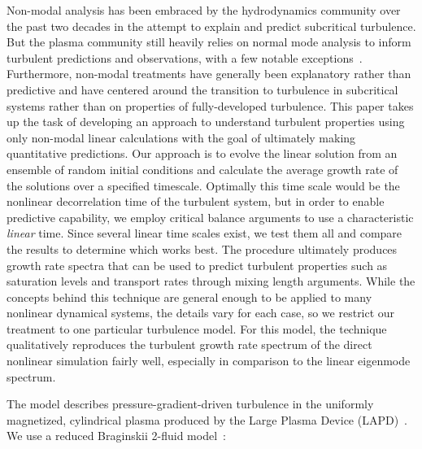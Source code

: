 \documentclass[letter,scriptaddress,twocolumn, prl,showkeys]{revtex4}
\begin{document}
Non-modal analysis has been embraced by the hydrodynamics community over the past two decades in the attempt to explain and predict subcritical turbulence. But the plasma community
still heavily relies on normal mode analysis to inform turbulent predictions and observations, with a few notable exceptions~\cite{camargo1998,camporeale2010,schekochihin2012}. 
Furthermore, non-modal treatments have generally been explanatory rather than predictive and have centered around the transition to turbulence in subcritical systems rather 
than on properties of fully-developed turbulence.
This paper takes up the task of developing an approach to understand turbulent properties using only non-modal linear calculations with the goal of 
ultimately making quantitative predictions. 
Our approach is to evolve the linear solution from an ensemble of random initial conditions 
and calculate the average growth rate of the solutions over a specified timescale.  Optimally this time scale would be the
nonlinear decorrelation time of the turbulent system, but in order to enable predictive capability, we employ critical balance
arguments to use a characteristic \emph{linear} time. Since several linear time scales exist, we test them all and compare the results to determine which works best.
The procedure ultimately produces growth rate spectra that can be used to predict turbulent properties such as saturation levels and transport rates through mixing length arguments.
While the concepts behind this technique are general enough to be applied to many nonlinear dynamical systems, the details vary for each case, 
so we restrict our treatment to one particular turbulence model. For this model, the technique qualitatively reproduces the turbulent growth rate spectrum of the direct 
nonlinear simulation fairly well, especially in comparison to the linear eigenmode spectrum.

The model describes pressure-gradient-driven turbulence in the uniformly magnetized, cylindrical plasma
produced by the Large Plasma Device (LAPD)~\cite{gekelman1991}. 
We use a reduced Braginskii 2-fluid model~\cite{Popovich2010a,Popovich2010b,Umansky2011,friedman2012b,friedman2013}:
\end{document}

